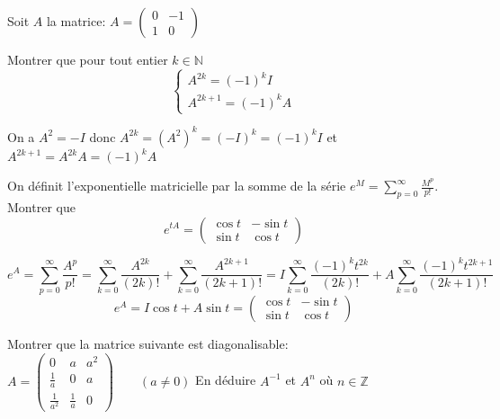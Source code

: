 \documentclass{article}[11pt]
\begin{document}
\begin{enumerate}
{\color{blue}
\item Soit $A$ la matrice: $\displaystyle A=\left(\begin{array}{cc} 0&-1\\1&0 \end{array}\right)$
}
\begin{enumerate}
{\color{blue}
\item Montrer que pour tout entier $k\in\mathbb{N}$
\[\left\{\begin{array}{l}
A^{2k}=(-1)^kI\\
A^{2k+1}=(-1)^kA
\end{array}\right.\]
}
On a $A^2=-I$ donc $A^{2k}=(A^2)^k=(-I)^k=(-1)^kI$ et $A^{2k+1}=A^{2k}A=(-1)^kA$

{\color{blue}
\item On définit l'exponentielle matricielle par la somme de la série $\displaystyle e^M=\sum_{p=0}^\infty\frac{M^p}{p!}$. Montrer que
\[e^{tA}=\left(\begin{array}{cc} \cos t&-\sin t\\ \sin t&\cos t
\end{array}\right)\]
}
\[e^A=\sum_{p=0}^\infty\frac{A^p}{p!} =\sum_{k=0}^\infty\frac{A^{2k}}{(2k)!} +\sum_{k=0}^\infty\frac{A^{2k+1}}{(2k+1)!} =I\sum_{k=0}^\infty\frac{(-1)^{k}t^{2k}}{(2k)!} +A\sum_{k=0}^\infty\frac{(-1)^{k}t^{2k+1}}{(2k+1)!}  \]
\[e^A=I\cos t +A\sin t =\left(\begin{array}{cc} \cos t&-\sin t\\ \sin t&\cos t
\end{array}\right)\]
\end{enumerate}

{\color{blue}
\item Montrer que la matrice suivante est diagonalisable:
$ \displaystyle A=\left(\begin{array}{ccc} 0&a&a^2\\ \frac 1a&0&a\\\frac{1}{a^2}&\frac 1a&0
\end{array}\right)\qquad (a\neq 0)$
En déduire $A^{-1}$ et $A^n$ où $n\in\mathbb{Z}$
}


\end{enumerate}
\end{document}
